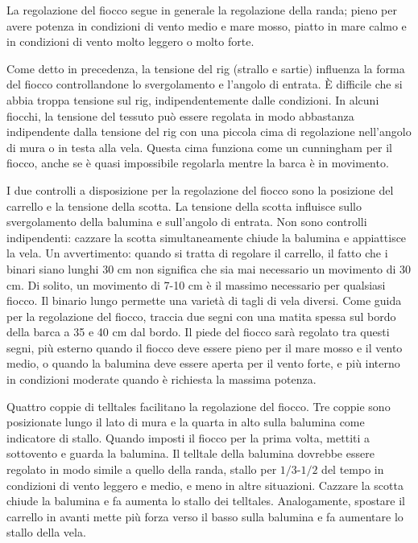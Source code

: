La regolazione del fiocco segue in generale la
regolazione della randa; pieno per avere potenza in condizioni di vento medio e
mare mosso, piatto in mare calmo e in condizioni di vento molto leggero o molto forte.

Come detto in precedenza, la tensione del rig (strallo e sartie) influenza la
forma del fiocco controllandone lo svergolamento e l'angolo di entrata. È
difficile che si abbia troppa tensione sul rig, indipendentemente dalle condizioni. In
alcuni fiocchi, la tensione del tessuto può essere regolata in modo abbastanza
indipendente dalla tensione del rig con una piccola cima di regolazione
nell'angolo di mura o in testa alla vela. Questa cima funziona come un
cunningham per il fiocco, anche se è quasi impossibile regolarla mentre la barca
è in movimento.

I due controlli a disposizione per la regolazione del fiocco sono la posizione
del carrello e la tensione della scotta. La tensione della scotta influisce
sullo svergolamento della balumina e sull'angolo di entrata. Non sono controlli
indipendenti: cazzare la scotta simultaneamente chiude la balumina e appiattisce
la vela. Un avvertimento: quando si tratta di regolare il carrello, il fatto che
i binari siano lunghi 30 cm non significa che sia mai necessario un movimento di
30 cm. Di solito, un movimento di 7-10 cm è il massimo necessario per qualsiasi
fiocco. Il binario lungo permette una varietà di tagli di vela diversi. Come
guida per la regolazione del fiocco, traccia due segni con una matita spessa sul
bordo della barca a 35 e 40 cm dal bordo. Il piede del fiocco sarà regolato tra
questi segni, più esterno quando il fiocco deve essere pieno per il mare mosso e
il vento medio, o quando la balumina deve essere aperta per il vento forte, e
più interno in condizioni moderate quando è richiesta la massima potenza. 

Quattro coppie di telltales facilitano la regolazione del fiocco. Tre coppie
sono posizionate lungo il lato di mura e la quarta in alto sulla balumina come
indicatore di stallo. Quando imposti il fiocco per la prima volta, mettiti a
sottovento e guarda la balumina. Il telltale della balumina dovrebbe essere
regolato in modo simile a quello della randa, stallo per $1/3$-$1/2$ del tempo
in condizioni di vento leggero e medio, e meno in altre situazioni. Cazzare la
scotta chiude la balumina e fa aumenta lo stallo dei telltales. Analogamente,
spostare il carrello in avanti mette più forza verso il basso sulla balumina e
fa aumentare lo stallo della vela. 

